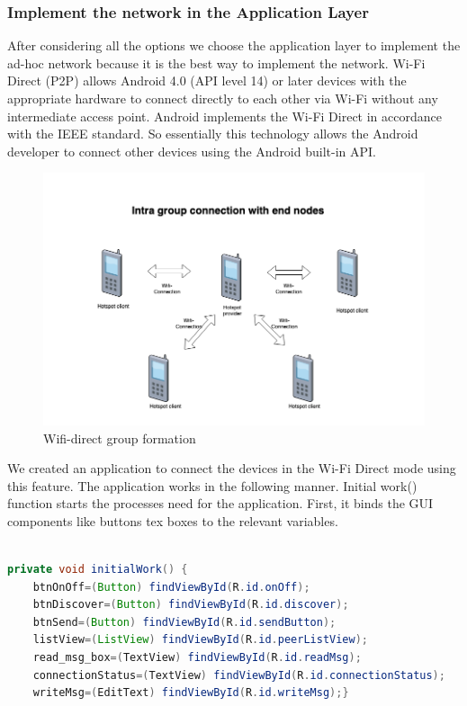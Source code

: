 \subsubsection{Implement the network in the Application Layer}
After considering all the options we choose the application layer to implement the ad-hoc network because it is the best way to implement the network. 
Wi-Fi Direct (P2P) allows Android 4.0 (API level 14) or later devices with the appropriate hardware to connect directly to each other via Wi-Fi without any intermediate access point\cite{WiFiDirect_android}. Android implements the Wi-Fi Direct in accordance with the IEEE standard. So essentially this technology allows the Android developer to connect other devices using the Android built-in API.
\vspace{12pt}
\begin{figure}[H]
    \centering
    \includegraphics[scale=0.44]{images/Intra_group_communication}
    \caption{Wifi-direct group formation}
    \label{fig:timedffline_123_12_23}
\end{figure}

We created an application to connect the devices in the Wi-Fi Direct mode using this feature.
The application works in the following manner. Initial work() function starts the processes need for the application. First, it binds the GUI components like buttons tex boxes to the relevant variables. 


\begin{lstlisting}[language=Java]

private void initialWork() {
    btnOnOff=(Button) findViewById(R.id.onOff);
    btnDiscover=(Button) findViewById(R.id.discover);
    btnSend=(Button) findViewById(R.id.sendButton);
    listView=(ListView) findViewById(R.id.peerListView);
    read_msg_box=(TextView) findViewById(R.id.readMsg);
    connectionStatus=(TextView) findViewById(R.id.connectionStatus);
    writeMsg=(EditText) findViewById(R.id.writeMsg);}
\end{lstlisting}

